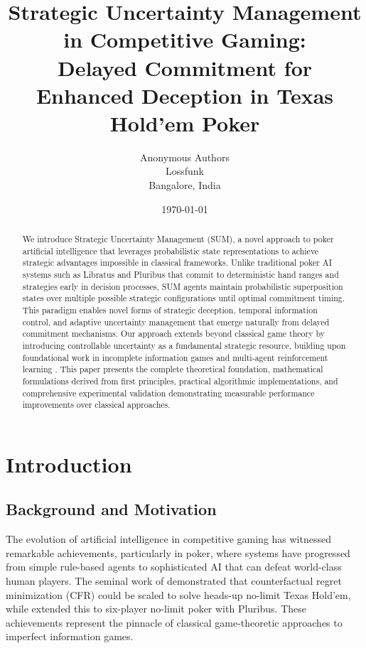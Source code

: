 \documentclass[11pt,a4paper]{article}
\title{\textbf{Strategic Uncertainty Management in Competitive Gaming:\\Delayed Commitment for Enhanced Deception in Texas Hold'em Poker}}
\author{Anonymous Authors\\Lossfunk \\Bangalore, India}
\date{\today}
\begin{document}
\maketitle

\begin{abstract}
We introduce Strategic Uncertainty Management (SUM), a novel approach to poker artificial intelligence that leverages probabilistic state representations to achieve strategic advantages impossible in classical frameworks. Unlike traditional poker AI systems such as Libratus \citep{brown2017superhuman} and Pluribus \citep{brown2019superhuman} that commit to deterministic hand ranges and strategies early in decision processes, SUM agents maintain probabilistic superposition states over multiple possible strategic configurations until optimal commitment timing. This paradigm enables novel forms of strategic deception, temporal information control, and adaptive uncertainty management that emerge naturally from delayed commitment mechanisms. Our approach extends beyond classical game theory by introducing controllable uncertainty as a fundamental strategic resource, building upon foundational work in incomplete information games \citep{harsanyi1967games} and multi-agent reinforcement learning \citep{foerster2016counterfactual}. This paper presents the complete theoretical foundation, mathematical formulations derived from first principles, practical algorithmic implementations, and comprehensive experimental validation demonstrating measurable performance improvements over classical approaches.
\end{abstract}

\section{Introduction}

\subsection{Background and Motivation}

The evolution of artificial intelligence in competitive gaming has witnessed remarkable achievements, particularly in poker, where systems have progressed from simple rule-based agents to sophisticated AI that can defeat world-class human players. The seminal work of \citet{brown2017superhuman} demonstrated that counterfactual regret minimization (CFR) could be scaled to solve heads-up no-limit Texas Hold'em, while \citet{brown2019superhuman} extended this to six-player no-limit poker with Pluribus. These achievements represent the pinnacle of classical game-theoretic approaches to imperfect information games.
\end{document}
